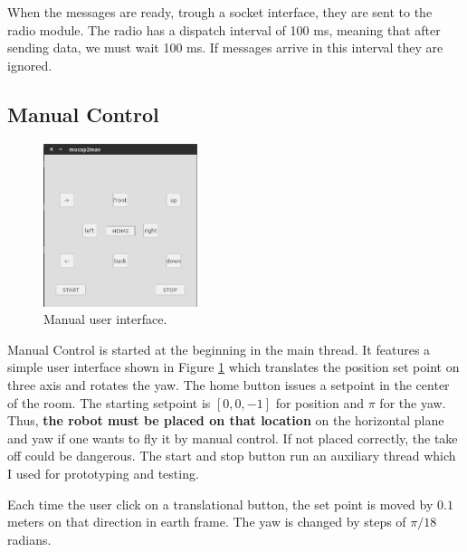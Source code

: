 When the messages are ready, trough a socket interface, they are sent to the radio module. The radio has a dispatch interval of 100 ms, meaning that after sending data, we must wait 100 ms. If messages arrive in this interval they are ignored. 

\subsection{Manual Control}

\begin{figure}[h]
\centering
 \includegraphics[width=0.4\textwidth]{mangui.png}
 \caption{Manual user interface.}
 \label{figure:mangui}
\end{figure}

Manual Control is started at the beginning in the main thread. It features a simple user interface shown in Figure \ref{figure:mangui} which translates the position set point on three axis and rotates the yaw. The home button issues a setpoint in the center of the room. The starting setpoint is $[0,0,-1]$ for position and $\pi$ for the yaw. Thus, \textbf{the robot must be placed on that location} on the horizontal plane and yaw if one wants to fly it by manual control. If not placed correctly, the take off could be dangerous. The start and stop button run an auxiliary thread which I used for prototyping and testing. 

Each time the user click on a translational button, the set point is moved by $0.1$ meters on that direction in earth frame. The yaw is changed by steps of $\pi/18$ radians.


